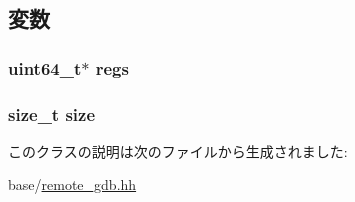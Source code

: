 \subsection{変数}
\hypertarget{classBaseRemoteGDB_1_1GdbRegCache_ac02cb30bb70aba580a68cd1e4f0df7ad}{
\subsubsection[{regs}]{\setlength{\rightskip}{0pt plus 5cm}uint64\_\-t$\ast$ {\bf regs}}}
\label{classBaseRemoteGDB_1_1GdbRegCache_ac02cb30bb70aba580a68cd1e4f0df7ad}
\hypertarget{classBaseRemoteGDB_1_1GdbRegCache_a854352f53b148adc24983a58a1866d66}{
\subsubsection[{size}]{\setlength{\rightskip}{0pt plus 5cm}size\_\-t {\bf size}}}
\label{classBaseRemoteGDB_1_1GdbRegCache_a854352f53b148adc24983a58a1866d66}


このクラスの説明は次のファイルから生成されました:\begin{DoxyCompactItemize}
\item 
base/\hyperlink{base_2remote__gdb_8hh}{remote\_\-gdb.hh}\end{DoxyCompactItemize}
